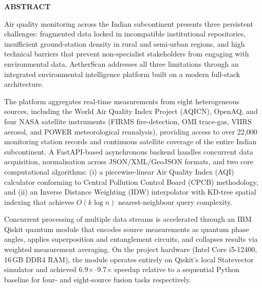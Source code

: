 \documentclass[12pt,a4paper]{article}
\begin{document}
\hfuzz=2pt
\justifying



\setcounter{page}{1}
\begin{center}
{\bfseries\fontsize{16}{18}\selectfont ABSTRACT}
\end{center}

Air quality monitoring across the Indian subcontinent presents three persistent
challenges: fragmented data locked in incompatible institutional repositories,
insufficient ground-station density in rural and semi-urban regions, and high
technical barriers that prevent non-specialist stakeholders from engaging with
environmental data. AetherScan addresses all three limitations through an
integrated environmental intelligence platform built on a modern full-stack
architecture.

The platform aggregates real-time measurements from eight heterogeneous sources,
including the World Air Quality Index Project (AQICN), OpenAQ, and four NASA
satellite instruments (FIRMS fire-detection, OMI trace-gas, VIIRS aerosol, and
POWER meteorological reanalysis), providing access to over 22,000 monitoring
station records and continuous satellite coverage of the entire Indian
subcontinent. A FastAPI-based asynchronous backend handles concurrent data
acquisition, normalisation across JSON/XML/GeoJSON formats, and two core
computational algorithms: (i) a piecewise-linear Air Quality Index (AQI)
calculator conforming to Central Pollution Control Board (CPCB) methodology,
and (ii) an Inverse Distance Weighting (IDW) interpolator with KD-tree spatial
indexing that achieves $O(k\log n)$ nearest-neighbour query complexity.

Concurrent processing of multiple data streams is accelerated through an IBM
Qiskit quantum module that encodes source measurements as quantum phase angles,
applies superposition and entanglement circuits, and collapses results via
weighted measurement averaging. On the project hardware (Intel Core i5-12400,
16\,GB DDR4 RAM), the module operates entirely on Qiskit's local Statevector
simulator and achieved 6.9$\times$--9.7$\times$ speedup relative to a sequential
Python baseline for four- and eight-source fusion tasks respectively.
\end{document}
